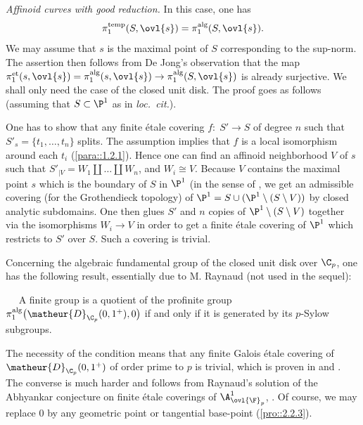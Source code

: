\begin{para}\label{para::2.3.4} {\it Affinoid curves with good reduction.} In
 this case, one has 
 \begin{equation*}
  \pi_1^{\mathrm{temp}}(S,\ovl{s})=\pi_1^{\mathrm{alg}}(S,\ovl{s}) .
 \end{equation*} 
 We may assume that $s$ is the maximal point of $S$ corresponding to the
 sup-norm. The assertion then follows from De Jong's observation 
 \cite[7.5]{efgonas} that the map
 $\pi^{\mathrm{et}}_1(s,\ovl{s})=\pi^{\mathrm{alg}}_1(s,\ovl{s})\to
 \pi^{\mathrm{alg}}_1(S,\ovl{s})$ is already surjective. We shall only
 need the case of the closed unit disk. The proof goes 
 as follows (assuming that $S\subset \P^1$ as in {\it loc.~cit.}).

 One has to show that any finite \'etale covering $f:\;S'\to S$ of
 degree $n$ such that $S'_s= \{t_1,\ldots, t_n\}$ splits.  The
 assumption implies that $f$ is a local isomorphism around each $t_i$
 (\cf \ref{para::1.2.1}). Hence one can find an affinoid neighborhood $V$ of $s$ such
 that $S'_{| V}= W_1\coprod \ldots \coprod W_n$, and $W_i\cong
 V$. Because $V$ contains the maximal point $s$ which is the boundary of
 $S$ in $\P^1$ (in the sense of \cite[3.1]{staagonf}, we get an admissible
 covering (for the Grothendieck topology) of $\P^1= S \cup
 (\P^1\setminus(S\setminus V))$ by closed analytic subdomains. One then
 glues $S'$ and $n$ copies of $\P^1\setminus(S\setminus V)$ together via
 the isomorphisms $W_i\to V$ in order to get a finite \'etale covering of
 $\P^1$ which restricts to $S'$ over $S$. Such a covering is trivial.
 
 \medskip Concerning the algebraic fundamental group of the closed unit
 disk over $\C_p$, one has the following result, 
 essentially due to M. Raynaud (not used in the sequel):
\end{para}

\begin{thm}\label{thm::2.3.5} $\quad$ A finite group is a quotient of the
 profinite group $\;$ 
 $\pi_1^{\mathrm{alg}}\bigl(\matheur{D}_{\C_p}(0,1^+),0\bigr)$
 if and only if it is generated by its $p$-Sylow subgroups.
\end{thm}

 The necessity of the condition means that any finite Galois
 \'etale covering of $\matheur{D}_{\C_p}(0,1^+)$ of order prime to $p$
 is trivial, which is proven in \cite[6.3.3]{ecfnas} and
 \cite[2.11]{repfapf}.  The 
 converse is much harder and follows from Raynaud's solution of the
 Abhyankar conjecture on finite \'etale coverings of $\A^1_{\ovl{\F}_p}$,
 \cf \cite{rdldaecpecd}. Of course, we may replace $0$ by any geometric
point or tangential base-point (\cf \ref{pro::2.2.3}).


